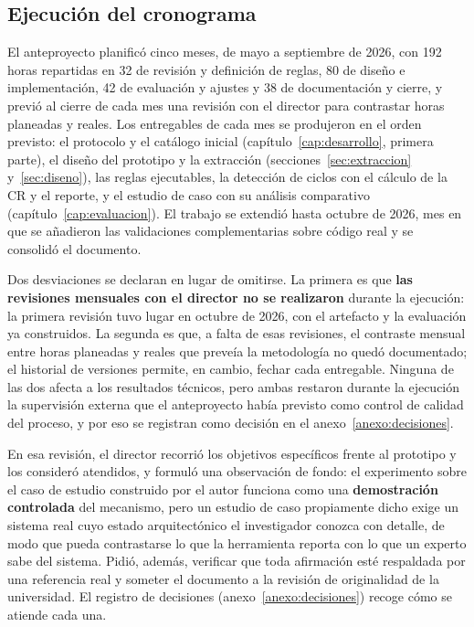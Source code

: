\subsection{Ejecución del cronograma}
El anteproyecto planificó cinco meses, de mayo a septiembre de 2026, con 192 horas repartidas en 32 de revisión y definición de reglas, 80 de diseño e implementación, 42 de evaluación y ajustes y 38 de documentación y cierre, y previó al cierre de cada mes una revisión con el director para contrastar horas planeadas y reales. Los entregables de cada mes se produjeron en el orden previsto: el protocolo y el catálogo inicial (capítulo~\ref{cap:desarrollo}, primera parte), el diseño del prototipo y la extracción (secciones~\ref{sec:extraccion} y~\ref{sec:diseno}), las reglas ejecutables, la detección de ciclos con el cálculo de la CR y el reporte, y el estudio de caso con su análisis comparativo (capítulo~\ref{cap:evaluacion}). El trabajo se extendió hasta octubre de 2026, mes en que se añadieron las validaciones complementarias sobre código real y se consolidó el documento.

Dos desviaciones se declaran en lugar de omitirse. La primera es que \textbf{las revisiones mensuales con el director no se realizaron} durante la ejecución: la primera revisión tuvo lugar en octubre de 2026, con el artefacto y la evaluación ya construidos. La segunda es que, a falta de esas revisiones, el contraste mensual entre horas planeadas y reales que preveía la metodología no quedó documentado; el historial de versiones permite, en cambio, fechar cada entregable. Ninguna de las dos afecta a los resultados técnicos, pero ambas restaron durante la ejecución la supervisión externa que el anteproyecto había previsto como control de calidad del proceso, y por eso se registran como decisión en el anexo~\ref{anexo:decisiones}.

En esa revisión, el director recorrió los objetivos específicos frente al prototipo y los consideró atendidos, y formuló una observación de fondo: el experimento sobre el caso de estudio construido por el autor funciona como una \textbf{demostración controlada} del mecanismo, pero un estudio de caso propiamente dicho exige un sistema real cuyo estado arquitectónico el investigador conozca con detalle, de modo que pueda contrastarse lo que la herramienta reporta con lo que un experto sabe del sistema. Pidió, además, verificar que toda afirmación esté respaldada por una referencia real y someter el documento a la revisión de originalidad de la universidad. El registro de decisiones (anexo~\ref{anexo:decisiones}) recoge cómo se atiende cada una.

